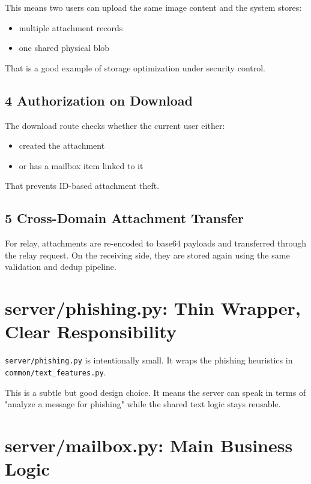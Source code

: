 \documentclass[11pt,a4paper]{article}
\begin{document}
This means two users can upload the same image content and the system stores:

\begin{itemize}
\item multiple attachment records
\item one shared physical blob
\end{itemize}

That is a good example of storage optimization under security control.

\subsection{4 Authorization on Download}

The download route checks whether the current user either:

\begin{itemize}
\item created the attachment
\item or has a mailbox item linked to it
\end{itemize}

That prevents ID-based attachment theft.

\subsection{5 Cross-Domain Attachment Transfer}

For relay, attachments are re-encoded to base64 payloads and transferred through the relay request. On the receiving side, they are stored again using the same validation and dedup pipeline.


\section{server/phishing.py: Thin Wrapper, Clear Responsibility}

\nolinkurl{server/phishing.py} is intentionally small. It wraps the phishing heuristics in \nolinkurl{common/text_features.py}.

This is a subtle but good design choice. It means the server can speak in terms of "analyze a message for phishing" while the shared text logic stays reusable.


\section{server/mailbox.py: Main Business Logic}
\end{document}
